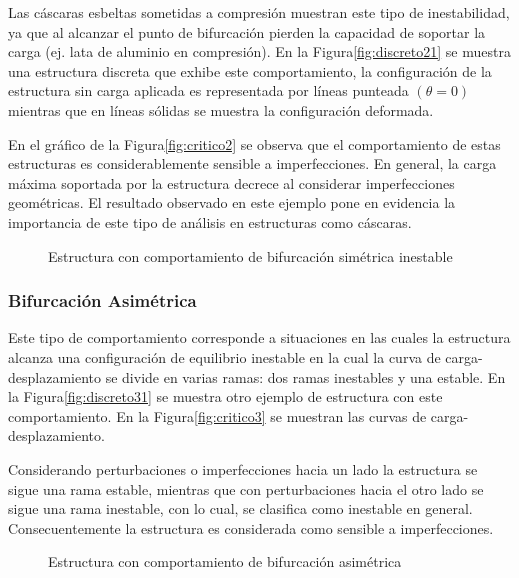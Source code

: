 Las cáscaras esbeltas sometidas a compresión muestran este tipo de inestabilidad, ya que al alcanzar el punto de bifurcación pierden la capacidad de soportar la carga (ej. lata de aluminio en compresión). En la Figura\autoref{fig:discreto21} se muestra una estructura discreta que exhibe este comportamiento, la configuración de la estructura sin carga aplicada es representada por líneas punteada $(\theta = 0)$ mientras que en líneas sólidas se muestra la configuración deformada.

En el gráfico de la Figura\autoref{fig:critico2} se observa que el comportamiento de estas estructuras es considerablemente sensible a imperfecciones. En general, la carga máxima soportada por la estructura decrece al considerar imperfecciones geométricas. El resultado observado en este ejemplo pone en evidencia la importancia de este tipo de análisis en estructuras como cáscaras.
\begin{figure}[htb]
	\centering
	\hspace{1em}
	\caption{Estructura con comportamiento de bifurcación simétrica inestable}
	\label{fig:simetrica2}
\end{figure}

\subsubsection{Bifurcación Asimétrica}

Este tipo de comportamiento corresponde a situaciones en las cuales la estructura alcanza una configuración de equilibrio inestable en la cual la curva de carga-desplazamiento se divide en varias ramas: dos ramas inestables y una estable. En la
Figura\autoref{fig:discreto31} se muestra otro ejemplo de estructura con este comportamiento. En la Figura\autoref{fig:critico3} se muestran las curvas de carga-desplazamiento.

Considerando perturbaciones o imperfecciones hacia un lado la estructura se sigue una rama estable, mientras que con perturbaciones hacia el otro lado se sigue una rama inestable, con lo cual, se clasifica como inestable en general. Consecuentemente la estructura es considerada como sensible a imperfecciones.
\begin{figure}[htb]
	\centering
	\hspace{1em}
	\caption{Estructura con comportamiento de bifurcación asimétrica}
	\label{fig:asimetrica}
\end{figure}




